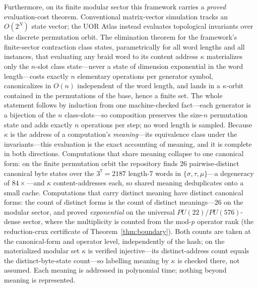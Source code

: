 Furthermore, on its finite modular sector this framework carries a \emph{proved} evaluation-cost theorem. Conventional matrix-vector simulation tracks an $O(2^N)$ state vector; the UOR Atlas instead evaluates topological invariants over the discrete permutation orbit. The elimination theorem for the framework's finite-sector contraction class states, parametrically for all word lengths and all instances, that evaluating any braid word to its content address $\kappa$ materializes only the $n$-slot class state---never a state of dimension exponential in the word length---costs exactly $n$ elementary operations per generator symbol, canonicalizes in $O(n)$ independent of the word length, and lands in a $\kappa$-orbit contained in the permutations of the base, hence a finite set. The whole statement follows by induction from one machine-checked fact---each generator is a bijection of the $n$ class-slots---so composition preserves the size-$n$ permutation state and adds exactly $n$ operations per step; no word length is sampled. Because $\kappa$ is the address of a computation's \emph{meaning}---its equivalence class under the invariants---this evaluation is the exact accounting of meaning, and it is complete in both directions. Computations that share meaning collapse to one canonical form: on the finite permutation orbit the repository finds $26$ pairwise-distinct canonical byte states over the $3^{7}=2187$ length-$7$ words in $\{\sigma,\tau,\mu\}$---a degeneracy of $84\times$---and $\kappa$ content-addresses each, so shared meaning deduplicates onto a small cache. Computations that carry distinct meaning have distinct canonical forms: the count of distinct forms is the count of distinct meanings---$26$ on the modular sector, and proved \emph{exponential} on the universal $PU(22)$/$PU(576)$-dense sector, where the multiplicity is counted from the mod-$p$ operator rank (the reduction-crux certificate of Theorem~\ref{thm:boundary}). Both counts are taken at the canonical-form and operator level, independently of the hash; on the materialized modular set $\kappa$ is verified injective---its distinct-address count equals the distinct-byte-state count---so labelling meaning by $\kappa$ is checked there, not assumed. Each meaning is addressed in polynomial time; nothing beyond meaning is represented.


